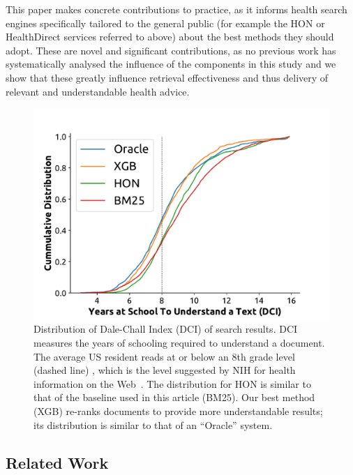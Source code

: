 \documentclass[10pt,a4paper]{article}
\begin{document}
This paper makes concrete contributions to practice, as it informs health search engines specifically tailored to the general public (for example the HON or HealthDirect services referred to above) about the best methods they should adopt. These are novel and significant contributions, as no previous work has systematically analysed the influence of the components in this study and we show that these greatly influence retrieval effectiveness and thus delivery of relevant and understandable health advice.

\begin{figure}[t!]
	\centering
	\includegraphics[width=.51\textwidth]{graphics/cumdist}
	\caption{Distribution of Dale-Chall Index (DCI) of search results. DCI measures the years of schooling required to understand a document. The average US resident reads at or below an 8th grade level (dashed line) \cite{cowan04,wallace04,davis04,stossel12}, which is the level suggested by NIH for health information on the Web~\cite{clear94}. The distribution for HON is similar to that of the baseline used in this article (BM25). Our best method (XGB) re-ranks documents to provide more understandable results; its distribution is similar to that of an ``Oracle'' system.}
	\label{fig:dist}
\end{figure}






\subsection{Related Work}
\end{document}
